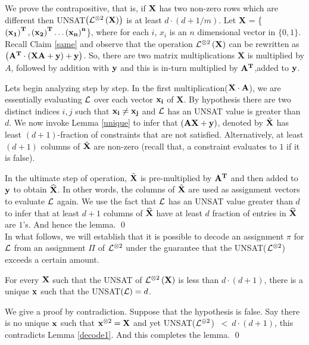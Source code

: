 {We prove the contrapositive, that is, if ${\bf X}$ has two non-zero rows which
are different then UNSAT$\left({\cal L}^{\otimes 2}\left({\bf
      X}\right)\right)$ is at least $d \cdot \left(d +
  1/m\right)$. Let {\bf X} = \Big\{${\bf \left(x_1\right)^T,
  \left(x_2\right)^T \ldots \left(x_n\right)^n}$\Big\}, where for each
$i$, $x_i$ is an $n$ dimensional vector in $\{0,1\}$. Recall Claim
\ref{same} and observe that the operation ${\cal L}^{\otimes 2}\left({\bf
    X} \right)$ can be rewritten as $\left({\bf A^T} \cdot \left({\bf
      X A} + {\bf y}\right) + {\bf y} \right)$. So, there are two
matrix multiplications {\bf X} is multiplied by $A$, followed by
addition with ${\bf y}$ and this is in-turn multiplied by ${\bf
  A^T}$,added to ${\bf y}$.

Lets begin analyzing step by step. In the first multiplication(${\bf X
  \cdot A}$), we are essentially evaluating ${\cal L}$ over each vector
${\bf x_i}$ of {\bf X}. By hypothesis there are two distinct indices
$i,j$ such that ${\bf x_i \ne x_j}$ and ${\cal L}$ has an UNSAT value is
greater than $d$.  We now invoke Lemma \ref{unique} to infer that
$\left({\bf A X} + {\bf y}\right)$, denoted by $\tilde{\bf X}$ has
least $(d+1)$-fraction of constraints that are not satisfied.
Alternatively, at least $\left(d +1\right)$ columns of $\tilde{\bf X}$
are non-zero (recall that, a constraint evaluates to $1$ if it is
false).

In the ultimate step of operation, $\tilde{\bf X}$ is pre-multiplied
by ${\bf A^T}$ and then added to ${\bf y}$ to obtain $\widehat{\bf X}$. In
other words, the columns of $\tilde{\bf X}$ are used as assignment
vectors to evaluate ${\cal L}$ again. We use the fact that ${\cal L}$ has an
UNSAT value greater than $d$ to infer that at least $d+1$ columns of
$\widehat{\bf X}$ have at least $d$ fraction of entries in $\widehat{\bf X}$
are $1$'s. And hence the lemma.  \qed \\


\noindent In what follows, we will establish that it is possible to
decode an assignment $\pi$ for ${\cal L}$ from an assignment $\Pi$ of
${\cal L}^{\otimes 2}$ under the guarantee that the UNSAT(${\cal L}^{\otimes
  2}$) exceeds a certain amount.


\begin{lemma}\label{decode}
  For every ${\bf X}$ such that the UNSAT of ${\cal L}^{\otimes
    2}\left({\bf X}\right)$ is less than $d \cdot (d+1)$, there is a
  unique ${\bf x}$ such that the UNSAT$\left({\cal L}\right) = d$.
\end{lemma}
 We give a proof by contradiction. Suppose that
the hypothesis is false. Say there is no unique ${\bf x}$ such that
${\bf x}^{\otimes 2} = {\bf X}$ and yet UNSAT(${\cal L}^{\oplus 2}$) $\ < \
d \cdot(d+1)$, this contradicts Lemma \ref{decode1}.  And this
completes the lemma. \qed \\



}
